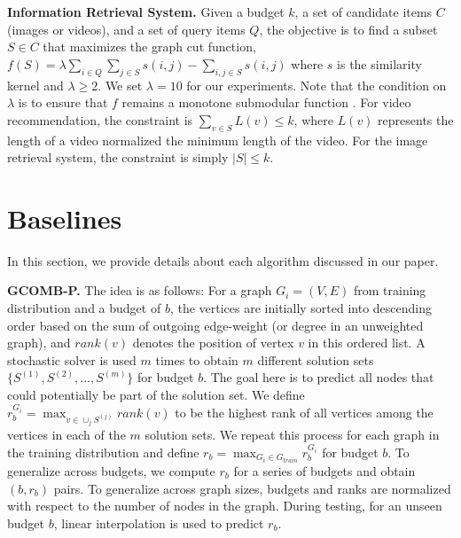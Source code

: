 \textbf{Information Retrieval System.} Given a budget $k$, a set of candidate items $C$ (images or videos), and a set of query items $Q$, the objective is to find a subset $S \in C$ that maximizes the graph cut function, $f(S) = \lambda \sum_{i \in Q} \sum_{j \in S} s(i,j) - \sum_{i,j \in S} s(i,j) $  where $s$ is the similarity kernel and $\lambda \geq 2$. We set $\lambda = 10$ for our experiments. Note that the condition on $\lambda$ is to ensure that $f$ remains a monotone submodular function \cite{iyer2021submodular}. For video recommendation, the constraint is $\sum_{v \in S} L(v) \leq k$, where $L(v)$ represents the length of a video normalized the minimum length of the video. For the image retrieval system, the constraint is simply $|S| \leq k$.


\section{Baselines} \label{appendix:baselines}
In this section, we provide details about each algorithm discussed in our paper.



\textbf{GCOMB-P.} The idea is as follows: For a graph $G_{i} = (V, E)$ from training distribution and a budget of $b$, the vertices are initially sorted into descending order based on the sum of outgoing edge-weight (or degree in an unweighted graph), and $rank(v)$ denotes the position of vertex $v$ in this ordered list. A stochastic solver is used $m$ times to obtain $m$ different solution sets $ \{S^{(1)},S^{(2)},...,S^{(m)}\} $ for budget $b$. The goal here is to predict all nodes that could potentially be part of the solution set.  We define $r^{G_i}_{b}= \max_{v \in \cup_{j} S^{(j)}} rank(v)$ to be the highest rank of all vertices among the vertices in each of the $m$ solution sets. We repeat this process for each graph in the training distribution and define $r_{b} = \max_{G_i \in G_{train}} r^{G_i}_{b}$ for budget $b$. To generalize across budgets, we compute $r_b$ for a series of budgets and obtain $(b,r_b)$ pairs. To generalize across graph sizes, budgets and ranks are normalized with respect to the number of nodes in the graph. During testing, for an unseen budget $b$, linear interpolation is used to predict $r_b$.



